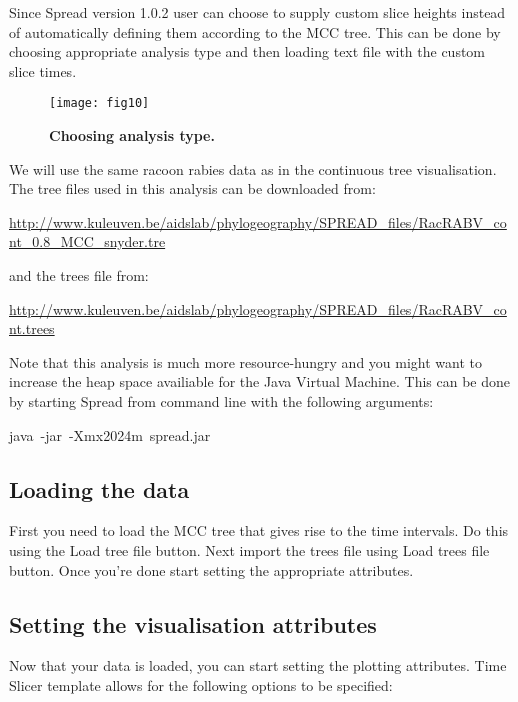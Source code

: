 Since Spread version 1.0.2 user can choose to supply custom slice
heights instead of automatically defining them according to the MCC
tree. This can be done by choosing appropriate analysis type and then
loading text file with the custom slice times.

\begin{figure}[H]
\begin{centering}
\texttt{[image: fig10]}
\caption{
{ \footnotesize 
{\bf Choosing analysis type.}
} %
}
\label{fig:10}
\par\end{centering}
\end{figure}

We will use the same racoon rabies data as in the continuous tree
visualisation. The tree files used in this analysis can be downloaded
from:

\url{http://www.kuleuven.be/aidslab/phylogeography/SPREAD_files/RacRABV_cont_0.8_MCC_snyder.tre}

\noindent
and the trees file from:

\url{http://www.kuleuven.be/aidslab/phylogeography/SPREAD_files/RacRABV_cont.trees}

\noindent
Note that this analysis is much more resource-hungry and you might
want to increase the heap space availiable for the Java Virtual Machine.
This can be done by starting Spread from command line with the following
arguments: 

\begin{lyxcode}
java~-jar~-Xmx2024m~spread.jar
\end{lyxcode}

\subsection{Loading the data}

First you need to load the MCC tree that gives rise to the time intervals.
Do this using the Load tree file button. Next import the trees file
using Load trees file button. Once you're done start setting the appropriate
attributes.


\subsection{Setting the visualisation attributes}

Now that your data is loaded, you can start setting the plotting attributes.
Time Slicer template allows for the following options to be specified: 

